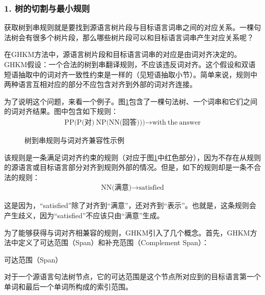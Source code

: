 
\subsubsection{1. 树的切割与最小规则}

\parinterval 获取树到串规则就是要找到源语言树片段与目标语言词串之间的对应关系。一棵句法树会有很多个树片段，那么哪些树片段可以和目标语言词串产生对应关系呢？

\parinterval 在GHKM方法中，源语言树片段和目标语言词串的对应是由词对齐决定的。GHKM假设：一个合法的树到串翻译规则，不应该违反词对齐。这个假设和双语短语抽取中的词对齐一致性约束是一样的（见{\chapterseven}短语抽取小节）。简单来说，规则中两种语言互相对应的部分不应包含对齐到外部的词对齐连接。

\parinterval 为了说明这个问题，来看一个例子。图\ref{fig:8-23}包含了一棵句法树、一个词串和它们之间的词对齐结果。图中包含如下规则：
\begin{eqnarray}
\textrm{PP(P(对)}\ \textrm{NP(NN(回答)))} \rightarrow \textrm{with}\ \textrm{the}\ \textrm{answer} \nonumber
\end{eqnarray}

\begin{figure}[htp]
\centering

\caption{树到串规则与词对齐兼容性示例}
\label{fig:8-23}
\end{figure}

\parinterval 该规则是一条满足词对齐约束的规则（对应于图\ref{fig:8-23}中红色部分），因为不存在从规则的源语言或目标语言部分对齐到规则外部的情况。但是，如下的规则却是一条不合法的规则：
\begin{eqnarray}
\textrm{NN(满意)} \rightarrow \textrm{satisfied} \nonumber
\end{eqnarray}

\parinterval 这是因为，“satisfied”除了对齐到“满意”，还对齐到“表示”。也就是，这条规则会产生歧义，因为“satisfied”不应该只由“满意”生成。

\parinterval 为了能够获得与词对齐相兼容的规则，GHKM引入了几个概念。首先，GHKM方法中定义了可达范围（Span）和补充范围（Complement Span）：

\vspace{0.5em}
\begin{definition} 可达范围（Span）

{\small
对于一个源语言句法树节点，它的可达范围是这个节点所对应到的目标语言第一个单词和最后一个单词所构成的索引范围。
}
\end{definition}


